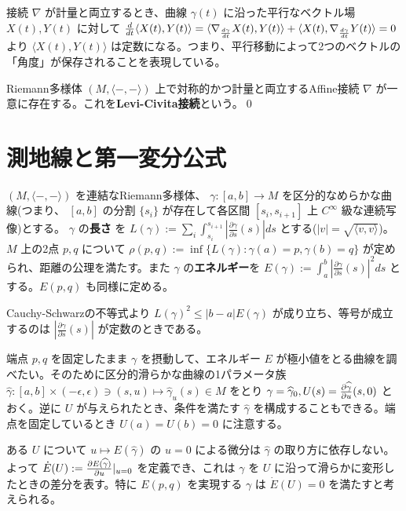 \documentclass[dvipdfmx,a4paper]{jsreport}
\theoremstyle{definition}
\newcommand{\der}{\partial}
\renewcommand{\hat}{\widehat}
\begin{document}
接続 $\nabla$ が計量と両立するとき、曲線 $\gamma(t)$ に沿った平行なベクトル場 $X(t),Y(t)$ に対して $\frac{d}{dt}\langle X(t),Y(t) \rangle=\langle \nabla_{d\gamma \over {dt}} X(t),Y(t)\rangle+\langle X(t),\nabla_{d\gamma \over {dt}} Y(t)\rangle=0$ より $\langle X(t),Y(t)\rangle$ は定数になる。つまり、平行移動によって2つのベクトルの「角度」が保存されることを表現している。

\thm Riemann多様体 $(M,\langle -,- \rangle)$ 上で対称的かつ計量と両立するAffine接続 $\nabla$ が一意に存在する。これを\textbf{Levi-Civita接続}という。\qed

\section{測地線と第一変分公式}

 $(M,\langle -,- \rangle)$ を連結なRiemann多様体、 $\gamma \colon [a,b] \to M$ を区分的なめらかな曲線(つまり、 $[a,b]$ の分割 $\{s_i\}$ が存在して各区間 $[s_i,s_{i+1}]$ 上 $C^\infty$ 級な連続写像)とする。 $\gamma$ の\textbf{長さ} を $L(\gamma) := \sum_{i} \int_{s_i}^{s_{i+1}}|\frac{\der \gamma}{\der s}(s)| ds$ とする($|v|=\sqrt{\langle v,v\rangle}$)。$M$ 上の2点 $p,q$ について $\rho(p,q) := \inf\{L(\gamma) \colon \gamma(a)=p,\gamma(b)=q\}$ が定められ、距離の公理を満たす。また $\gamma$ の\textbf{エネルギー}を $E(\gamma) := \int_{a}^b |\frac{\der \gamma}{\der s}(s)|^2 ds$ とする。$E(p,q)$ も同様に定める。


Cauchy-Schwarzの不等式より $L(\gamma)^2 \leq |b-a|E(\gamma)$ が成り立ち、等号が成立するのは $|\frac{\der \gamma}{\der s}(s)|$ が定数のときである。


端点 $p,q$ を固定したまま $\gamma$ を摂動して、エネルギー $E$ が極小値をとる曲線を調べたい。そのために区分的滑らかな曲線の1パラメータ族 $\hat{\gamma}:[a,b] \times (-\epsilon,\epsilon) \ni (s,u)\mapsto \hat{\gamma}_u(s) \in M$ をとり $\gamma=\hat{\gamma}_0,U(s)={{\der \hat{\gamma}} \over {\der u}}(s,0)$ とおく。逆に $U$ が与えられたとき、条件を満たす $\hat{\gamma}$ を構成することもできる。端点を固定しているとき $U(a)=U(b)=0$ に注意する。

ある $U$ について $u \mapsto E(\hat{\gamma})$ の $u=0$ による微分は $\hat{\gamma}$ の取り方に依存しない。よって $\dot{E}(U) := {\der E(\hat{\gamma}) \over \der u}|_{u=0}$ を定義でき、これは $\gamma$ を $U$ に沿って滑らかに変形したときの差分を表す。特に $E(p,q)$ を実現する $\gamma$ は $\dot{E}(U)=0$ を満たすと考えられる。
\end{document}
